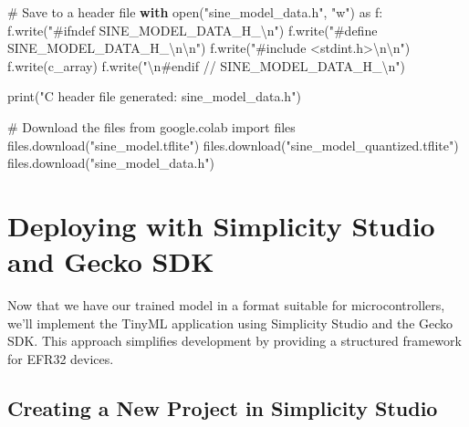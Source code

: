 \documentclass[
  9pt,
  letterpaper,
  abstract,
  titlepage]{scrbook}
\newenvironment{Shaded}{\begin{snugshade}}{\end{snugshade}}
\newcommand{\BuiltInTok}[1]{\textcolor[rgb]{0.00,0.23,0.31}{#1}}
\newcommand{\CharTok}[1]{\textcolor[rgb]{0.13,0.47,0.30}{#1}}
\newcommand{\CommentTok}[1]{\textcolor[rgb]{0.37,0.37,0.37}{#1}}
\newcommand{\ControlFlowTok}[1]{\textcolor[rgb]{0.00,0.23,0.31}{\textbf{#1}}}
\newcommand{\ImportTok}[1]{\textcolor[rgb]{0.00,0.46,0.62}{#1}}
\newcommand{\NormalTok}[1]{\textcolor[rgb]{0.00,0.23,0.31}{#1}}
\newcommand{\StringTok}[1]{\textcolor[rgb]{0.13,0.47,0.30}{#1}}
\begin{document}
\begin{Shaded}
\begin{Highlighting}[]
\CommentTok{\# Save to a header file}
\ControlFlowTok{with} \BuiltInTok{open}\NormalTok{(}\StringTok{"sine\_model\_data.h"}\NormalTok{, }\StringTok{"w"}\NormalTok{) }\ImportTok{as}\NormalTok{ f:}
\NormalTok{    f.write(}\StringTok{"\#ifndef SINE\_MODEL\_DATA\_H\_}\CharTok{\textbackslash{}n}\StringTok{"}\NormalTok{)}
\NormalTok{    f.write(}\StringTok{"\#define SINE\_MODEL\_DATA\_H\_}\CharTok{\textbackslash{}n\textbackslash{}n}\StringTok{"}\NormalTok{)}
\NormalTok{    f.write(}\StringTok{"\#include \textless{}stdint.h\textgreater{}}\CharTok{\textbackslash{}n\textbackslash{}n}\StringTok{"}\NormalTok{)}
\NormalTok{    f.write(c\_array)}
\NormalTok{    f.write(}\StringTok{"}\CharTok{\textbackslash{}n}\StringTok{\#endif  // SINE\_MODEL\_DATA\_H\_}\CharTok{\textbackslash{}n}\StringTok{"}\NormalTok{)}

\BuiltInTok{print}\NormalTok{(}\StringTok{"C header file generated: sine\_model\_data.h"}\NormalTok{)}

\CommentTok{\# Download the files}
\ImportTok{from}\NormalTok{ google.colab }\ImportTok{import}\NormalTok{ files}
\NormalTok{files.download(}\StringTok{"sine\_model.tflite"}\NormalTok{)}
\NormalTok{files.download(}\StringTok{"sine\_model\_quantized.tflite"}\NormalTok{)}
\NormalTok{files.download(}\StringTok{"sine\_model\_data.h"}\NormalTok{)}
\end{Highlighting}
\end{Shaded}

\section{Deploying with Simplicity Studio and Gecko
SDK}\label{deploying-with-simplicity-studio-and-gecko-sdk}

Now that we have our trained model in a format suitable for
microcontrollers, we'll implement the TinyML application using
Simplicity Studio and the Gecko SDK. This approach simplifies
development by providing a structured framework for EFR32 devices.

\subsection{Creating a New Project in Simplicity
Studio}\label{creating-a-new-project-in-simplicity-studio}
\end{document}
